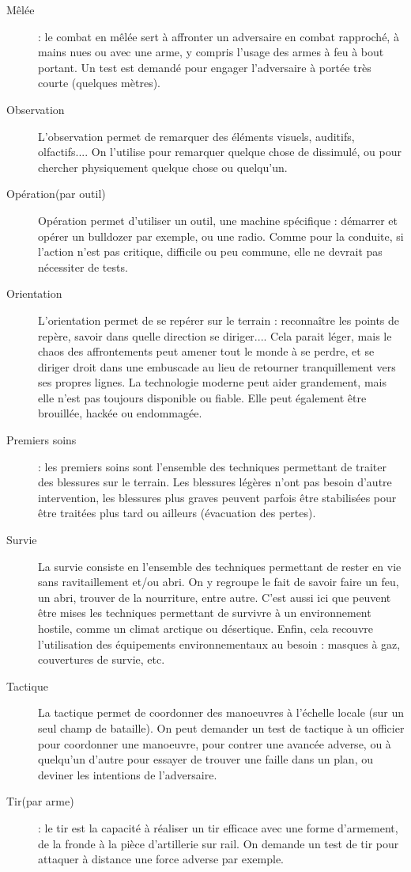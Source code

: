 \documentclass{report}
\begin{document}
\begin{multicols}{2}
\begin{description}
    \item[Mêlée]: le combat en mêlée sert à affronter un adversaire en combat rapproché, à mains nues ou avec une arme, y compris l'usage des armes à feu à bout portant. Un test est demandé pour engager l'adversaire à portée très courte (quelques mètres).
    \item[Observation] L'observation permet de remarquer des éléments visuels, auditifs, olfactifs.... On l'utilise pour remarquer quelque chose de dissimulé, ou pour chercher physiquement quelque chose ou quelqu'un.
    \item[Opération(par outil)] Opération permet d'utiliser un outil, une machine spécifique : démarrer et opérer un bulldozer par exemple, ou une radio. Comme pour la conduite, si l'action n'est pas critique, difficile ou peu commune, elle ne devrait pas nécessiter de tests.
    \item[Orientation] L'orientation permet de se repérer sur le terrain : reconnaître les points de repère, savoir dans quelle direction se diriger.... Cela parait léger, mais le chaos des affrontements peut amener tout le monde à se perdre, et se diriger droit dans une embuscade au lieu de retourner tranquillement vers ses propres lignes. La technologie moderne peut aider grandement, mais elle n'est pas toujours disponible ou fiable. Elle peut également être brouillée, hackée ou endommagée.
    \item[Premiers soins]: les premiers soins sont l'ensemble des techniques permettant de traiter des blessures sur le terrain. Les blessures légères n'ont pas besoin d'autre intervention, les blessures plus graves peuvent parfois être stabilisées pour être traitées plus tard ou ailleurs (évacuation des pertes).
    \item[Survie] La survie consiste en l'ensemble des techniques permettant de rester en vie sans ravitaillement et/ou abri. On y regroupe le fait de savoir faire un feu, un abri, trouver de la nourriture, entre autre. C'est aussi ici que peuvent être mises les techniques permettant de survivre à un environnement hostile, comme un climat arctique ou désertique. Enfin, cela recouvre l'utilisation des équipements environnementaux au besoin : masques à gaz, couvertures de survie, etc.
    \item[Tactique]La tactique permet de coordonner des manoeuvres à l'échelle locale (sur un seul champ de bataille). On peut demander un test de tactique à un officier pour coordonner une manoeuvre, pour contrer une avancée adverse, ou à quelqu'un d'autre pour essayer de trouver une faille dans un plan, ou deviner les intentions de l'adversaire.
    \item[Tir(par arme)]: le tir est la capacité à réaliser un tir efficace avec une forme d'armement, de la fronde à la pièce d'artillerie sur rail. On demande un test de tir pour attaquer à distance une force adverse par exemple.
\end{description}

\end{multicols}
\end{document}
